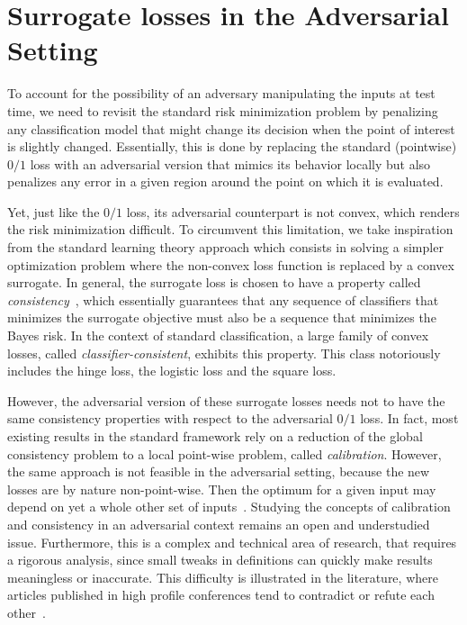 \section{Surrogate losses in the Adversarial Setting}
\label{sec:rw-q2}
To account for the possibility of an adversary manipulating the inputs at test time, we need to revisit the standard risk minimization problem by penalizing any classification model that might change its decision when the point of interest is slightly changed. Essentially, this is done by replacing the standard (pointwise) $0/1$ loss with an adversarial version that mimics its behavior locally but also penalizes any error in a given region around the point on which it is evaluated.


Yet, just like the $0/1$ loss, its adversarial counterpart is not convex, which renders the risk minimization difficult. To circumvent this limitation, we take inspiration from the standard learning theory approach which consists in solving a simpler optimization problem where the non-convex loss function is replaced by a convex surrogate. In general, the surrogate loss is chosen to have a property called \emph{consistency}~\citep{zhang2004statistical,bartlett2006convexity,steinwart2007compare}, which essentially guarantees that any sequence of classifiers that minimizes the surrogate objective must also be a sequence that minimizes the Bayes risk. In the context of standard classification, a large family of convex losses, called \textit{classifier-consistent}, exhibits this property. This class notoriously includes the hinge loss, the logistic loss and the square loss. 

However, the adversarial version of these surrogate losses needs not to have the same consistency properties with respect to the adversarial $0/1$ loss. In fact, most existing results in the standard framework rely on a reduction of the global consistency problem to a local point-wise problem, called \textit{calibration}. However, the same approach is not feasible in the adversarial setting, because the new losses are by nature non-point-wise. Then the optimum for a given input may depend on yet a whole other set of inputs~\citep{awasthi2021calibration,awasthi2021finer}. Studying the concepts of calibration and consistency in an adversarial context remains an open and understudied issue. 
Furthermore, this is a complex and technical area of research, that requires a rigorous analysis, since small tweaks in definitions can quickly make results meaningless or inaccurate.
This difficulty is illustrated in the literature, where articles published in high profile conferences tend to contradict or refute each other~\cite{bao2020calibrated,awasthi2021calibration,awasthi2021finer}. 






